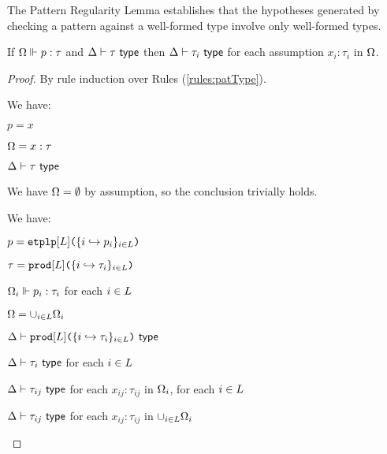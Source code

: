 {{{{The Pattern Regularity Lemma establishes that the hypotheses generated by checking a pattern against a well-formed type involve only well-formed types.
\begin{lemma}\label{lemma:pattern-regularity-UP} 
If $\Omega \Vdash p : \tau$ and $\Delta \vdash \tau~\mathsf{type}$ then $\Delta \vdash \tau_i~\mathsf{type}$ for each assumption $x_i : \tau_i$ in $\Omega$.
\end{lemma}
\begin{proof} By rule induction over Rules (\ref{rules:patType}).
\begin{byCases}
\item[\text{(\ref{rule:patType-var})}] We have:
\begin{pfsteps*}
  \item $p=x$ 
  \item $\Omega=x : \tau$ 
  \item $\Delta \vdash \tau~\mathsf{type}$ 
 \end{pfsteps*}
 \resetpfcounter
\item[\text{(\ref{rule:patType-wild})}] We have $\Omega=\emptyset$ by assumption, so the conclusion trivially holds.
\item[\text{(\ref{rule:patType-tpl})}] We have:
\begin{pfsteps*}
  \item $p=\texttt{etplp}[L]\texttt{(}\{i \hookrightarrow p_{i}\}_{i \in L}\texttt{)}$ 
  \item $\tau=\texttt{prod}[L]\texttt{(}\{i \hookrightarrow \tau_{i}\}_{i \in L}\texttt{)}$ 
  \item $\Omega_i \Vdash p_i : \tau_i$ for each $i \in L$ 
  \item $\Omega=\cup_{i \in L} \Omega_i$ 
  \item $\Delta \vdash \texttt{prod}[L]\texttt{(}\{i \hookrightarrow \tau_{i}\}_{i \in L}\texttt{)}~\mathsf{type}$  
  \item $\Delta \vdash \tau_i~\mathsf{type}$ for each $i \in L$ 
  \item $\Delta \vdash \tau_{ij}~\mathsf{type}$ for each $x_{ij} : \tau_{ij}$ in $\Omega_i$, for each $i \in L$  
  \item $\Delta \vdash \tau_{ij}~\mathsf{type}$ for each $x_{ij} : \tau_{ij}$ in $\cup_{i \in L}\Omega_i$ 

\end{pfsteps*}
\end{byCases}
\end{proof}}}}}
